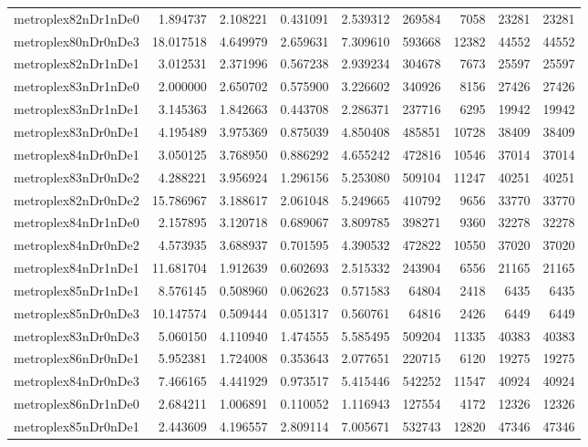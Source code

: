 \begin{longtable}{|l|r|r|r|r|r|r|r|r|}
metroplex82nDr1nDe0 & 1.894737 & 2.108221 & 0.431091 & 2.539312 & 269584 & 7058 & 23281 & 23281 \\
metroplex80nDr0nDe3 & 18.017518 & 4.649979 & 2.659631 & 7.309610 & 593668 & 12382 & 44552 & 44552 \\
metroplex82nDr1nDe1 & 3.012531 & 2.371996 & 0.567238 & 2.939234 & 304678 & 7673 & 25597 & 25597 \\
metroplex83nDr1nDe0 & 2.000000 & 2.650702 & 0.575900 & 3.226602 & 340926 & 8156 & 27426 & 27426 \\
metroplex83nDr1nDe1 & 3.145363 & 1.842663 & 0.443708 & 2.286371 & 237716 & 6295 & 19942 & 19942 \\
metroplex83nDr0nDe1 & 4.195489 & 3.975369 & 0.875039 & 4.850408 & 485851 & 10728 & 38409 & 38409 \\
metroplex84nDr0nDe1 & 3.050125 & 3.768950 & 0.886292 & 4.655242 & 472816 & 10546 & 37014 & 37014 \\
metroplex83nDr0nDe2 & 4.288221 & 3.956924 & 1.296156 & 5.253080 & 509104 & 11247 & 40251 & 40251 \\
metroplex82nDr0nDe2 & 15.786967 & 3.188617 & 2.061048 & 5.249665 & 410792 & 9656 & 33770 & 33770 \\
metroplex84nDr1nDe0 & 2.157895 & 3.120718 & 0.689067 & 3.809785 & 398271 & 9360 & 32278 & 32278 \\
metroplex84nDr0nDe2 & 4.573935 & 3.688937 & 0.701595 & 4.390532 & 472822 & 10550 & 37020 & 37020 \\
metroplex84nDr1nDe1 & 11.681704 & 1.912639 & 0.602693 & 2.515332 & 243904 & 6556 & 21165 & 21165 \\
metroplex85nDr1nDe1 & 8.576145 & 0.508960 & 0.062623 & 0.571583 & 64804 & 2418 & 6435 & 6435 \\
metroplex85nDr0nDe3 & 10.147574 & 0.509444 & 0.051317 & 0.560761 & 64816 & 2426 & 6449 & 6449 \\
metroplex83nDr0nDe3 & 5.060150 & 4.110940 & 1.474555 & 5.585495 & 509204 & 11335 & 40383 & 40383 \\
metroplex86nDr0nDe1 & 5.952381 & 1.724008 & 0.353643 & 2.077651 & 220715 & 6120 & 19275 & 19275 \\
metroplex84nDr0nDe3 & 7.466165 & 4.441929 & 0.973517 & 5.415446 & 542252 & 11547 & 40924 & 40924 \\
metroplex86nDr1nDe0 & 2.684211 & 1.006891 & 0.110052 & 1.116943 & 127554 & 4172 & 12326 & 12326 \\
metroplex85nDr0nDe1 & 2.443609 & 4.196557 & 2.809114 & 7.005671 & 532743 & 12820 & 47346 & 47346 \\

\end{longtable}
